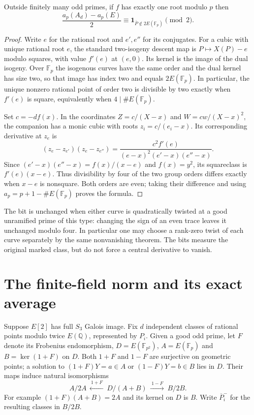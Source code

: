\documentclass[11pt]{article}
\newcommand{\Q}{\mathbb Q}\newcommand{\F}{\mathbb F}\newcommand{\Sha}{\mathrm{Sha}}
\begin{document}
\begin{proposition}\label{th:bit}
Outside finitely many odd primes, if $f$ has exactly one root modulo
$p$ then
\[
 \frac{a_p(A_d)-a_p(E)}2\equiv
 \mathbf1_{\overline P\notin 2E(\F_p)}\pmod2 .
\]
\end{proposition}
\begin{proof}
Write $e$ for the rational root and $e',e''$ for its conjugates.
For a cubic with unique rational root $e$, the standard two-isogeny
descent map is $P\mapsto X(P)-e$ modulo squares, with value
$f'(e)$ at $(e,0)$. Its kernel is the image of the dual isogeny.
Over $\F_p$ the isogenous curves have the same order and the dual
kernel has size two, so that image has index two and equals $2E(\F_p)$.
In particular, the unique nonzero rational point of order two is
divisible by two exactly when $f'(e)$ is square, equivalently when
$4\mid\#E(\F_p)$.

Set $c=-df(x)$. In the coordinates $Z=c/(X-x)$ and
$W=cw/(X-x)^2$, the companion has a monic cubic with roots
$z_i=c/(e_i-x)$. Its corresponding derivative at $z_e$ is
\[
 (z_e-z_{e'})(z_e-z_{e''})
 =\frac{c^2 f'(e)}{(e-x)^2(e'-x)(e''-x)}.
\]
Since $(e'-x)(e''-x)=f(x)/(x-e)$ and $f(x)=y^2$, its squareclass
is $f'(e)(x-e)$. Thus divisibility by four of the two group orders
differs exactly when $x-e$ is nonsquare. Both orders are even; taking
their difference and using $a_p=p+1-\#E(\F_p)$ proves the formula.
\end{proof}
The bit is unchanged when either curve is quadratically twisted at a
good unramified prime of this type: changing the sign of an even trace
leaves it unchanged modulo four. In particular one may choose a
rank-zero twist of each curve separately by the same nonvanishing
theorem. The bits measure the original marked class, but do not force
a central derivative to vanish.

\section{The finite-field norm and its exact average}
Suppose $E[2]$ has full $S_3$ Galois image. Fix $d$ independent
classes of rational points modulo twice $E(\Q)$, represented by
$P_i$. Given a good odd prime, let $F$ denote its Frobenius endomorphism,
$D=E(\F_{p^2})$, $A=E(\F_p)$ and $B=\ker(1+F)$ on $D$.
Both $1+F$ and $1-F$ are surjective on geometric points; a solution
to $(1+F)Y=a\in A$ or $(1-F)Y=b\in B$ lies in $D$. Their maps
induce natural isomorphisms
\[
 A/2A \ \xleftarrow{\ 1+F\ }\ D/(A+B)
   \ \xrightarrow{\ 1-F\ }\ B/2B .
\]
For example $(1+F)(A+B)=2A$ and its kernel on $D$ is $B$.
Write $\overline P_i^-$ for the resulting classes in $B/2B$.
\end{document}
